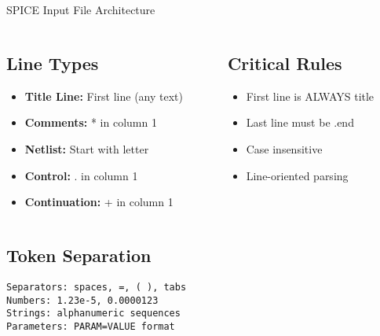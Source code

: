 \documentclass{beamer}
\begin{document}
\begin{frame}{SPICE Input File Architecture}
    \begin{columns}
        \begin{column}{0.5\textwidth}
            \subsection{Line Types}
            \begin{itemize}
                \item \textbf{Title Line:} First line (any text)
                \item \textbf{Comments:} * in column 1
                \item \textbf{Netlist:} Start with letter
                \item \textbf{Control:} . in column 1
                \item \textbf{Continuation:} + in column 1
            \end{itemize}
        \end{column}
        \begin{column}{0.5\textwidth}
            \subsection{Critical Rules}
            \begin{itemize}
                \item First line is ALWAYS title
                \item Last line must be .end
                \item Case insensitive
                \item Line-oriented parsing
            \end{itemize}
        \end{column}
    \end{columns}
    
    \subsection{Token Separation}
    \begin{lstlisting}
Separators: spaces, =, ( ), tabs
Numbers: 1.23e-5, 0.0000123
Strings: alphanumeric sequences
Parameters: PARAM=VALUE format
    \end{lstlisting}
\end{frame}
\end{document}
